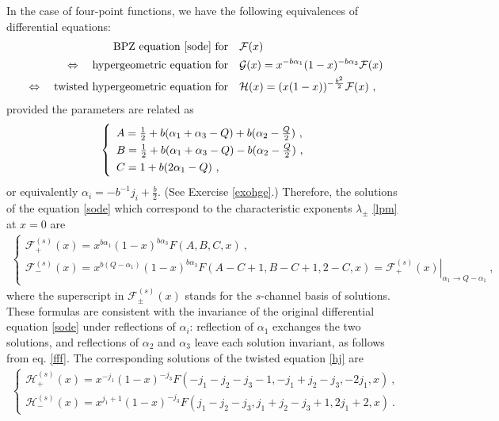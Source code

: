 \documentclass[12pt, a4paper, notitlepage, twoside]{report}
\numberwithin{equation}{section}
\theoremstyle{break}
\begin{document}
In the case of four-point functions, we have the following equivalences of differential equations:
\begin{align}
  \text{BPZ equation \eqref{sode} for}\quad  & \mathcal{F}(x)
\\ 
\Leftrightarrow\quad  \text{hypergeometric\ equation\ for\quad }&  \mathcal{G}(x)= x^{-b\alpha_1}(1-x)^{-b\alpha_3}\mathcal{F}(x) 
\\
\Leftrightarrow\quad  \text{twisted\ hypergeometric\ equation\ for\quad }& \mathcal{H}(x)=(x(1-x))^{-\frac{b^2}{2}}\mathcal{F}(x) \ ,
\label{fgs}
\end{align}
provided the parameters are related as
\begin{align}
\renewcommand{\arraystretch}{1.3}
\left\{\begin{array}{l}   A = \frac12 + b(\alpha_1+\alpha_3-Q) + b(\alpha_2-\tfrac{Q}{2}) \ , \\
      B = \frac12 + b(\alpha_1+\alpha_3-Q) - b(\alpha_2-\tfrac{Q}{2}) \ , \\
      C = 1 + b(2\alpha_1-Q) \ ,
\end{array}\right. 
\label{abc}
\end{align}
or equivalently $\alpha_i = -b^{-1}j_i +\frac{b}{2}$.
(See Exercise \ref{exohge}.) 
Therefore, the solutions of the equation \eqref{sode} which correspond to the characteristic exponents $\lambda_\pm$ \eqref{lpm} at $x=0$ are 
\begin{align}
\left\{\begin{array}{l}  \mathcal{F}^{(s)}_+(x) = x^{b\alpha_1} (1-x)^{b\alpha_3} F(A,B,C,x)\ ,
\\ \mathcal{F}^{(s)}_-(x)  =x^{b(Q-\alpha_1)} (1-x)^{b\alpha_3} F(A-C+1,B-C+1,2-C,x)= \left. \mathcal{F}^{(s)}_+(x) \right|_{\alpha_1\to Q-\alpha_1} \ ,
\end{array}\right. 
\label{gpm}
\end{align}
where the superscript in $\mathcal{F}^{(s)}_\pm(x)$ stands for the $s$-channel basis of solutions.
These formulas are consistent with the invariance of the original differential equation \eqref{sode} under reflections of $\alpha_i$: reflection of $\alpha_1$ exchanges the two solutions, and reflections of $\alpha_2$ and $\alpha_3$ leave each solution invariant, as follows from eq. \eqref{fff}.
The corresponding solutions of the twisted equation \eqref{hj} are 
\begin{align}
\left\{\begin{array}{l}  \mathcal{H}^{(s)}_+(x)  = x^{-j_1}(1-x)^{-j_3} F(-j_1-j_2-j_3-1,-j_1+j_2-j_3,-2j_1,x)\ ,
\\
 \mathcal{H}^{(s)}_-(x)  = x^{j_1+1}(1-x)^{-j_3} F(j_1-j_2-j_3,j_1+j_2-j_3+1,2j_1+2,x)\ .
\end{array}\right. 
\label{fpm}
\end{align}
\end{document}
